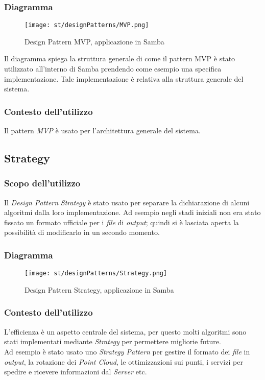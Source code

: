 \subsubsection{Diagramma}
\begin{figure}[H] 
    \centering 
    \texttt{[image: st/designPatterns/MVP.png]} 
    \caption{Design Pattern MVP, applicazione in Samba}
\end{figure}
Il diagramma spiega la struttura generale di come il pattern MVP è stato utilizzato all'interno di Samba prendendo come esempio una specifica implementazione. Tale implementazione è relativa alla struttura generale del sistema.
\subsubsection{Contesto dell'utilizzo}
Il pattern \emph{MVP} è usato per l'architettura generale del sistema. 

\subsection{Strategy}
\subsubsection{Scopo dell'utilizzo}
Il \emph{Design Pattern} \emph{Strategy} è stato usato per separare la dichiarazione di alcuni algoritmi dalla loro implementazione. Ad esempio negli stadi iniziali non era stato fissato un formato ufficiale per i \emph{file} di \emph{output}; quindi si è lasciata aperta la possibilità di modificarlo in un secondo momento.
\subsubsection{Diagramma}
\begin{figure}[H] 
    \centering 
    \texttt{[image: st/designPatterns/Strategy.png]} 
    \caption{Design Pattern Strategy, applicazione in Samba}
\end{figure}
\subsubsection{Contesto dell'utilizzo}
L'efficienza è un aspetto centrale del sistema, per questo molti algoritmi sono stati implementati mediante \emph{Strategy} per permettere migliorie future.\\
Ad esempio è stato usato uno \emph{Strategy Pattern} per gestire il formato dei \emph{file} in \emph{output}, la rotazione dei \emph{Point Cloud}, le ottimizzazioni sui punti, i servizi per spedire e ricevere informazioni dal \emph{Server} etc.

